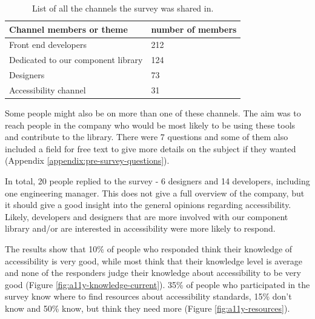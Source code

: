 \documentclass{master_thesis}
\begin{document}
\begin{table}[H]
	\centering
	\begin{tabular}{|l|l|}
		\hline
		\textbf{Channel members or theme} & \textbf{number of members}  \\
		\hline
		Front end developers  & 212  \\
		\hline
		Dedicated to our component library  & 124  \\
		\hline
		Designers  & 73  \\
		\hline
		Accessibility channel  & 31  \\
		\hline
	\end{tabular}
	\caption{List of all the channels the survey was shared in.}
	\label{table:survey-shared}
\end{table}

Some people might also be on more than one of these channels. The aim was to reach people in the company who would be most likely to be using these tools and contribute to the library. There were 7 questions and some of them also included a field for free text to give more details on the subject if they wanted (Appendix \ref{appendix:pre-survey-questions}).

In total, 20 people replied to the survey - 6 designers and 14 developers, including one engineering manager. This does not give a full overview of the company, but it should give a good insight into the general opinions regarding accessibility. Likely, developers and designers that are more involved with our component library and/or are interested in accessibility were more likely to respond.

The results show that 10\% of people who responded think their knowledge of accessibility is very good, while most think that their knowledge level is average and none of the responders judge their knowledge about accessibility to be very good (Figure \ref{fig:a11y-knowledge-current}). 35\% of people who participated in the survey know where to find resources about accessibility standards, 15\% don't know and 50\% know, but think they need more (Figure \ref{fig:a11y-resources}).
\end{document}
